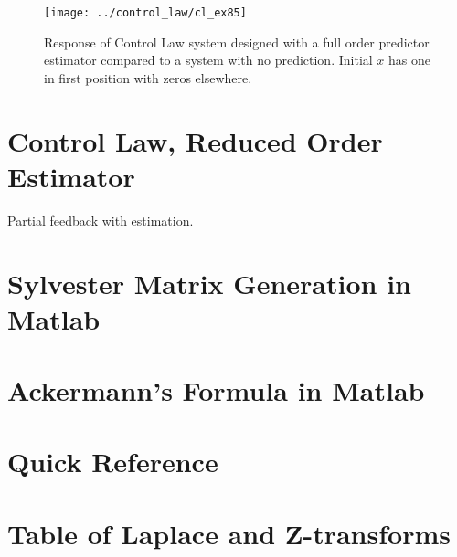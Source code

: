 \documentclass{article}
\begin{document}


\begin{figure}[h!]
\begin{center}
\texttt{[image: ../control\_law/cl\_ex85]}
\end{center}
\caption{Response of Control Law system designed with a full
order predictor estimator compared to a system with no prediction.
Initial $x$ has one in first position with zeros elsewhere.}
\label{fig:cl_ex85}
\end{figure}


\clearpage
\section{Control Law, Reduced Order Estimator}

Partial feedback with estimation.

\clearpage
\printbibliography[heading=bibintoc]

\clearpage
\appendix

\section{Sylvester Matrix Generation in Matlab}
\label{app:sylvester}



\section{Ackermann's Formula in Matlab}
\label{app:myacker}



\section{Quick Reference}

\section{Table of Laplace and Z-transforms}
\end{document}
